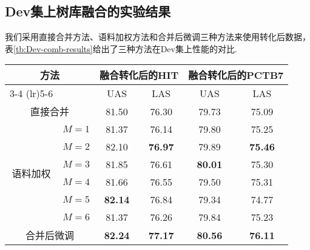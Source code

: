 \subsection{Dev集上树库融合的实验结果}
我们采用直接合并方法、语料加权方法和合并后微调三种方法来使用转化后数据，表\ref{tb:Dev-comb-results}给出了三种方法在Dev集上性能的对比.
\begin{table*}[hb!]
    \addtolength{\tabcolsep}{+1.0mm}
    \centering
    \caption{语料加权和合并后微调方法在Dev集上的性能影响}
    \label{tb:Dev-comb-results}
    \begin{tabular}{cc cc cc}
        \toprule
        \multicolumn{2}{c}{\multirow{2}{3.3cm}{方法}}
                                     & \multicolumn{2}{c}{融合转化后的HIT} & \multicolumn{2}{c}{融合转化后的PCTB7}                                  \\
        \cmidrule(lr){3-4}
        \cmidrule(lr){5-6}
                                     &                                     & UAS                                   & LAS      & UAS      & LAS      \\
        \midrule
        \multicolumn{2}{c}{直接合并} & 81.50                               & 76.30                                 & 79.73    & 75.09               \\
        \midrule
        \multirow{6}{2cm}{语料加权}
                                     & $M=1$                               & 81.37                                 & 76.14    & 79.80    & 75.25    \\
                                     & $M=2$                               & 82.10                                 & \bf76.97 & 79.89    & \bf75.46 \\
                                     & $M=3$                               & 81.85                                 & 76.61    & \bf80.01 & 75.30    \\
                                     & $M=4$                               & 81.66                                 & 76.55    & 79.50    & 75.31    \\
                                     & $M=5$                               & \bf82.14                              & 76.84    & 79.34    & 74.77    \\
                                     & $M=6$                               & 81.37                                 & 76.26    & 79.84    & 75.23    \\
        \midrule
        \multicolumn{2}{c}{合并后微调}
                                     & \bf82.24                            & \bf77.17                              & \bf80.56 & \bf76.11            \\
        \bottomrule
    \end{tabular}
\end{table*}

